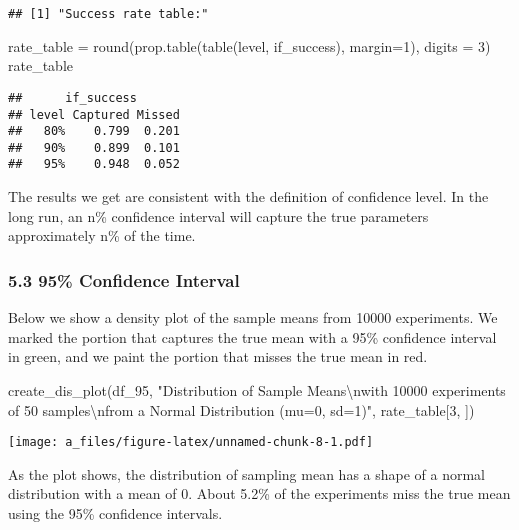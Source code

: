 \documentclass[
]{article}
\newenvironment{Shaded}{\begin{snugshade}}{\end{snugshade}}
\newcommand{\AttributeTok}[1]{\textcolor[rgb]{0.77,0.63,0.00}{#1}}
\newcommand{\DecValTok}[1]{\textcolor[rgb]{0.00,0.00,0.81}{#1}}
\newcommand{\FunctionTok}[1]{\textcolor[rgb]{0.00,0.00,0.00}{#1}}
\newcommand{\NormalTok}[1]{#1}
\newcommand{\OtherTok}[1]{\textcolor[rgb]{0.56,0.35,0.01}{#1}}
\newcommand{\SpecialCharTok}[1]{\textcolor[rgb]{0.00,0.00,0.00}{#1}}
\newcommand{\StringTok}[1]{\textcolor[rgb]{0.31,0.60,0.02}{#1}}
\begin{document}
\begin{verbatim}
## [1] "Success rate table:"
\end{verbatim}

\begin{Shaded}
\begin{Highlighting}[]
\NormalTok{rate\_table }\OtherTok{=} \FunctionTok{round}\NormalTok{(}\FunctionTok{prop.table}\NormalTok{(}\FunctionTok{table}\NormalTok{(level, if\_success), }
                              \AttributeTok{margin=}\DecValTok{1}\NormalTok{), }
                   \AttributeTok{digits =} \DecValTok{3}\NormalTok{)}
\NormalTok{rate\_table}
\end{Highlighting}
\end{Shaded}

\begin{verbatim}
##      if_success
## level Captured Missed
##   80%    0.799  0.201
##   90%    0.899  0.101
##   95%    0.948  0.052
\end{verbatim}

The results we get are consistent with the definition of confidence
level. In the long run, an n\% confidence interval will capture the true
parameters approximately n\% of the time.

\hypertarget{confidence-interval}{%
\subsubsection{5.3 95\% Confidence Interval}\label{confidence-interval}}

Below we show a density plot of the sample means from 10000 experiments.
We marked the portion that captures the true mean with a 95\% confidence
interval in green, and we paint the portion that misses the true mean in
red.

\begin{Shaded}
\begin{Highlighting}[]
\FunctionTok{create\_dis\_plot}\NormalTok{(df\_95,}
                \StringTok{"Distribution of Sample Means}\SpecialCharTok{\textbackslash{}n}\StringTok{with 10000 experiments of 50 samples}\SpecialCharTok{\textbackslash{}n}\StringTok{from a Normal Distribution (mu=0, sd=1)"}\NormalTok{,}
\NormalTok{                rate\_table[}\DecValTok{3}\NormalTok{, ])}
\end{Highlighting}
\end{Shaded}

\texttt{[image: a\_files/figure-latex/unnamed-chunk-8-1.pdf]}

As the plot shows, the distribution of sampling mean has a shape of a
normal distribution with a mean of 0. About 5.2\% of the experiments
miss the true mean using the 95\% confidence intervals.
\end{document}
